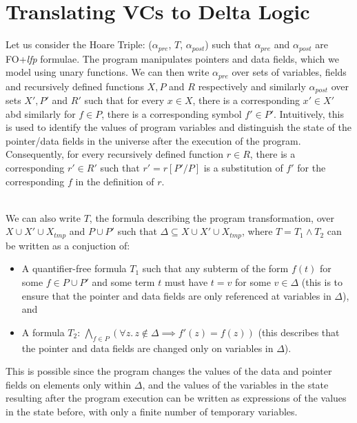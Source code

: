 	\section{Translating VCs to Delta Logic}
Let us consider the Hoare Triple: ($\alpha_{\textit{pre}}$, $T$, $\alpha_{\textit{post}}$) such that $\alpha_{pre}$ and $\alpha_{post}$ are FO+\textit{lfp} formulae. The program manipulates pointers and data fields, which we model using unary functions. We can then write $\alpha_{\textit{pre}}$ over sets of variables, fields and recursively defined functions $X, P$ and $R$ respectively and similarly $\alpha_{\textit{post}}$ over sets $X', P'$ and $R'$ such that for every $x \in{} X$, there is a corresponding $x' \in{} X'$ abd similarly for $f \in{} P$, there is a corresponding symbol $f' \in{} P'$. Intuitively, this is used to identify the values of program variables and distinguish the state of the pointer/data fields in the universe after the execution of the program. Consequently, for every recursively defined function $r \in{} R$, there is a corresponding $r' \in{} R'$ such that $r' = r[P'/P]$ is a substitution of $f'$ for the corresponding $f$ in the definition of $r$. \\\

We can also write $T$, the formula describing the program transformation, over $X \cup{} X' \cup{} X_{tmp}$ and $P \cup{} P'$ such that $\Delta{} \subseteq{} X \cup{} X' \cup{} X_{tmp} $, where $T = T_1 \land{} T_2$ can be written as a conjuction of:\\
\begin{itemize}
\item A quantifier-free formula $T_1$ such that any subterm of the form $f(t)$ for some $f \in{} P \cup{} P'$ and some term $t$ must have $t = v$ for some $v \in{} \Delta{}$ (this is to ensure that the pointer and data fields are only referenced at variables in $\Delta{}$), and\\
\item A formula $T_2$: $\bigwedge\limits_{f \in{} P} \left(\forall{}z.\,z\notin{}\Delta{} \implies{} f'(z) = f(z) \right)$ (this describes that the pointer and data fields are changed only on variables in $\Delta$). \\
\end{itemize} 
This is possible since the program changes the values of the data and pointer fields on elements only within $\Delta$, and the values of the variables in the state resulting after the program execution can be written as expressions of the values in the state before, with only a finite number of temporary variables.\\\

